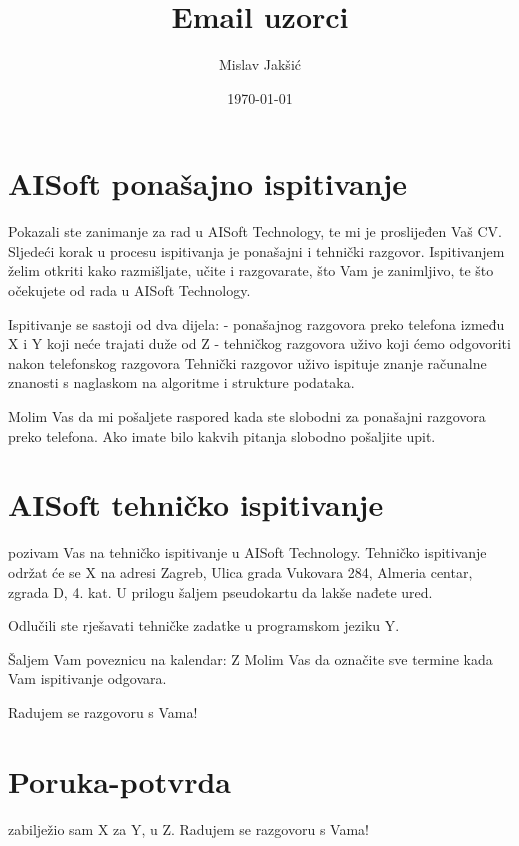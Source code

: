 \documentclass{article}
\title{Email uzorci}
\author{Mislav Jakšić}
\date{\today}
\begin{document}
\maketitle

\section{AISoft ponašajno ispitivanje}

Pokazali ste zanimanje za rad u AISoft Technology, te mi je proslijeđen Vaš CV.
Sljedeći korak u procesu ispitivanja je ponašajni i tehnički razgovor.
Ispitivanjem želim otkriti kako razmišljate, učite i razgovarate, što Vam je zanimljivo, te što očekujete od rada u AISoft Technology.

Ispitivanje se sastoji od dva dijela:
- ponašajnog razgovora preko telefona između X i Y koji neće trajati duže od Z
- tehničkog razgovora uživo koji ćemo odgovoriti nakon telefonskog razgovora
Tehnički razgovor uživo ispituje znanje računalne znanosti s naglaskom na algoritme i strukture podataka.

Molim Vas da mi pošaljete raspored kada ste slobodni za ponašajni razgovora preko telefona.
Ako imate bilo kakvih pitanja slobodno pošaljite upit.



\section{AISoft tehničko ispitivanje}

pozivam Vas na tehničko ispitivanje u AISoft Technology.
Tehničko ispitivanje održat će se X na adresi Zagreb, Ulica grada Vukovara 284, Almeria centar, zgrada D, 4. kat.
U prilogu šaljem pseudokartu da lakše nađete ured.

Odlučili ste rješavati tehničke zadatke u programskom jeziku Y.

Šaljem Vam poveznicu na kalendar: Z
Molim Vas da označite sve termine kada Vam ispitivanje odgovara.

Radujem se razgovoru s Vama!



\section{Poruka-potvrda}

zabilježio sam X za Y, u Z.
Radujem se razgovoru s Vama!
\end{document}
